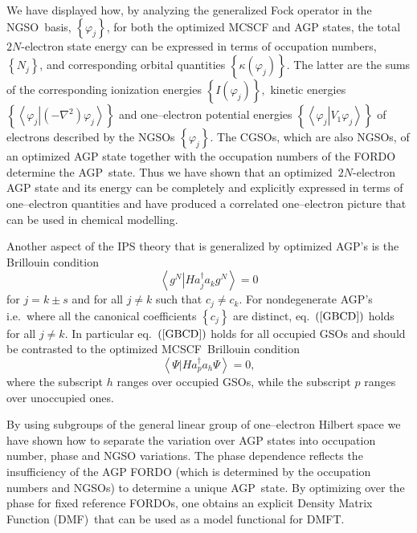 \documentclass[aps,preprint]{revtex4}%
\begin{document}
We have displayed how, by analyzing the generalized Fock operator in the
NGSO\ basis, $\left\{  \varphi_{j}\right\}  $, for both the optimized MCSCF
and AGP states, the total $2N$-electron state energy can be expressed in terms
of occupation numbers, $\left\{  N_{j}\right\}  $, and corresponding orbital
quantities $\left\{  \kappa\left(  \varphi_{j}\right)  \right\}  $. The latter
are the sums of the corresponding ionization energies $\left\{  I\left(
\varphi_{j}\right)  \right\}  ,$ kinetic energies $\left\{  \left\langle
\left.  \varphi_{j}\right\vert \left(  -\nabla^{2}\right)  \varphi
_{j}\right\rangle \right\}  $ and one--electron potential energies $\left\{
\left\langle \left.  \varphi_{j}\right\vert V_{1}\varphi_{j}\right\rangle
\right\}  $ of electrons described by the NGSOs $\left\{  \varphi_{j}\right\}
$. The CGSOs, which are also NGSOs, of an optimized AGP state together with
the occupation numbers of the FORDO determine the AGP\ state. Thus we have
shown that an optimized~$2N$-electron AGP state and its energy can be
completely and explicitly expressed in terms of one--electron quantities and
have produced a correlated one--electron picture that can be used in chemical modelling.

Another aspect of the IPS theory that is generalized by optimized AGP's is the
Brillouin condition
\begin{equation}
\left\langle \left.  g^{N}\right\vert Ha_{j}^{\dagger}a_{k}g^{N}\right\rangle
=0 \label{GBCD}%
\end{equation}
for $j=k\pm s$ and for all $j\neq k$ such that $c_{j}\neq c_{k}$. For
nondegenerate AGP's i.e.\ where all the canonical coefficients $\left\{
c_{j}\right\}  $ are distinct, eq.\ $\left(  \ref{GBCD}\right)  $ holds for
all $j\neq k$. In particular eq.\ $\left(  \ref{GBCD}\right)  $ holds for all
occupied GSOs and should be contrasted to the optimized MCSCF\ Brillouin
condition
\begin{equation}
\left\langle \left.  \Psi\right\vert Ha_{p}^{\dagger}a_{h}\Psi\right\rangle
=0,
\end{equation}
where the subscript $h$ ranges over occupied GSOs, while the subscript $p$
ranges over unoccupied ones.

By using subgroups of the general linear group of one--electron Hilbert space
we have shown how to separate the variation over AGP states into occupation
number, phase and NGSO variations. The phase dependence reflects the
insufficiency of the AGP FORDO (which is determined by the occupation numbers
and NGSOs) to determine a unique AGP\ state. By optimizing over the phase for
fixed reference FORDOs, one obtains an explicit Density Matrix Function
(DMF)\ that can be used as a model functional for DMFT.
\end{document}
